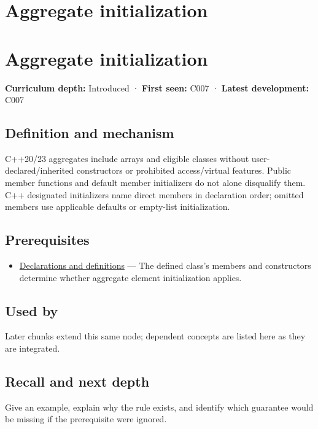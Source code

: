 \hypertarget{appendix-b7174c179542}{}
\section*{Aggregate initialization}
\section{Aggregate initialization}\label{aggregate-initialization}

\textbf{Curriculum depth:} Introduced · \textbf{First seen:} C007 · \textbf{Latest development:} C007

\subsection{Definition and mechanism}\label{definition-and-mechanism}

C++20/23 aggregates include arrays and eligible classes without user-declared/inherited constructors or prohibited access/virtual features. Public member functions and default member initializers do not alone disqualify them. C++ designated initializers name direct members in declaration order; omitted members use applicable defaults or empty-list initialization.

\subsection{Prerequisites}\label{prerequisites}

\begin{itemize}
\tightlist
\item
  \hyperref[appendix-2e4d494c2d94]{Declarations and definitions} --- The defined class's members and constructors determine whether aggregate element initialization applies.
\end{itemize}

\subsection{Used by}\label{used-by}

Later chunks extend this same node; dependent concepts are listed here as they are integrated.

\subsection{Recall and next depth}\label{recall-and-next-depth}

Give an example, explain why the rule exists, and identify which guarantee would be missing if the prerequisite were ignored.

